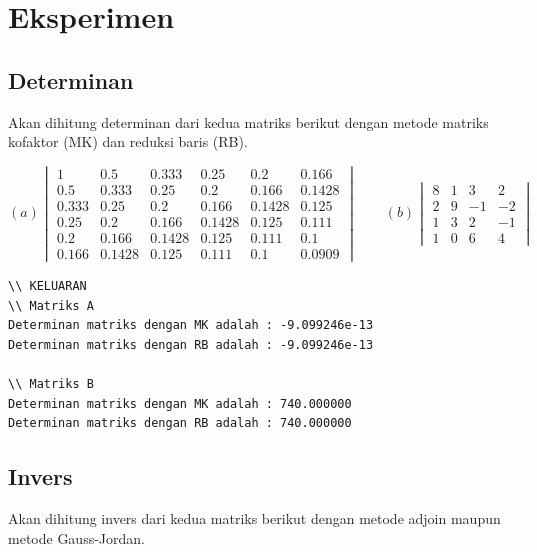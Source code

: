 \section{Eksperimen}

\subsection{Determinan}
Akan dihitung determinan dari kedua matriks berikut dengan metode matriks kofaktor (MK) dan reduksi baris (RB).

\[ (a) \begin{vmatrix}
1     & 0.5    & 0.333  & 0.25   & 0.2    & 0.166 \\
0.5   & 0.333  & 0.25   & 0.2    & 0.166  & 0.1428 \\
0.333 & 0.25   & 0.2    & 0.166  & 0.1428 & 0.125 \\
0.25  & 0.2    & 0.166  & 0.1428 & 0.125  & 0.111 \\
0.2   & 0.166  & 0.1428 & 0.125  & 0.111  & 0.1 \\
0.166 & 0.1428 & 0.125  & 0.111  & 0.1    & 0.0909 
\end{vmatrix} \qquad (b) 
\begin{vmatrix}
8 & 1 & 3  &2 \\
2 & 9 & -1 & -2 \\
1 & 3 & 2  &-1 \\
1 & 0 & 6  &4 
\end{vmatrix}\]

\begin{lstlisting}
\\ KELUARAN
\\ Matriks A
Determinan matriks dengan MK adalah : -9.099246e-13
Determinan matriks dengan RB adalah : -9.099246e-13

\\ Matriks B
Determinan matriks dengan MK adalah : 740.000000
Determinan matriks dengan RB adalah : 740.000000\end{lstlisting}

\subsection{Invers}

Akan dihitung invers dari kedua matriks berikut dengan metode adjoin maupun metode Gauss-Jordan.

